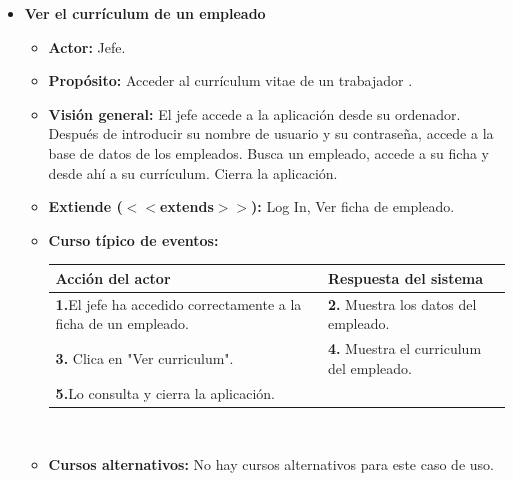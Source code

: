 \documentclass[spanish,a4paper,12pt]{report}		%
\begin{document}
\begin{itemize}
\begin{itemize}
\begin{itemize}
			\end {itemize}
		\end{itemize}%



	\item \textbf{Ver el currículum de un empleado}		
			\begin{itemize}
			\item \textbf{Actor:} Jefe.
			\item \textbf{Propósito: } Acceder al currículum vitae de un trabajador  .
			\item \textbf{Visión general:} El jefe accede a la aplicación desde su ordenador. Después de introducir su nombre de usuario y su contraseña, accede a la base de datos de los empleados. Busca un empleado, accede a su ficha y desde ahí a su currículum. Cierra la aplicación. 
			\item \textbf{Extiende ($<<$extends$>>$):} Log In, Ver ficha de empleado.
	\newpage
			\item \textbf{Curso típico de eventos:} 	\\
				\begin{tabular}{|p{6cm}||p{6cm}|}
				\hline
				\textbf{Acción del actor} & \textbf{Respuesta del sistema} \\ \hline \hline
				\textbf{1.}El jefe ha accedido correctamente a la ficha de un empleado. & \textbf{2.} Muestra los datos del empleado.\\ \hline
				\textbf{3.} Clica en "Ver curriculum".	& \textbf{4.} Muestra el curriculum del empleado. \\ \hline
				\textbf{5.}Lo consulta y cierra la aplicación. & \textbf{} \\ \hline
			\end{tabular}
			\\
			\item \textbf{Cursos alternativos:} No hay cursos alternativos para este caso de uso.
		\end{itemize}%






\end{itemize}
\end{document}
